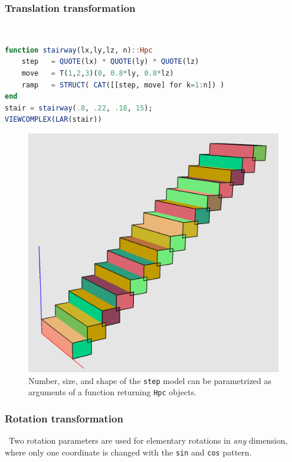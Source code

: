 \documentclass{juliacon}
\begin{document}
\subsubsection*{Translation transformation}\ 
\begin{lstlisting}[language = Julia,numbers=none,label={lst:exmpl2},
caption={Simple linear {\tt stair}, demonstrating an iterative use of tensors in {\small\tt STRUCT}. Of course, the number, size, and shape of the {\tt step} model can be parametrized as arguments of a geometric function returning {\tt Hpc} objects.}
]
function stairway(lx,ly,lz, n)::Hpc
	step   = QUOTE(lx) * QUOTE(ly) * QUOTE(lz)
	move   = T(1,2,3)(0, 0.8*ly, 0.8*lz)
	ramp   = STRUCT( CAT([[step, move] for k=1:n]) )
end 
stair = stairway(.8, .22, .18, 15);
VIEWCOMPLEX(LAR(stair))
\end{lstlisting}
\begin{figure}[htbp] %
    \includegraphics[width=0.35\linewidth]{figs/stair2}
     \caption{Number, size, and shape of the {\tt step} model can be parametrized as arguments of a function returning {\tt Hpc} objects.}
    \label{fig:stair}
\end{figure}


\subsubsection*{Rotation transformation}\ 
Two rotation parameters are used for elementary rotations in \emph{any} dimension, where only one coordinate is changed with the \texttt{sin} and \texttt{cos} pattern.
\end{document}
